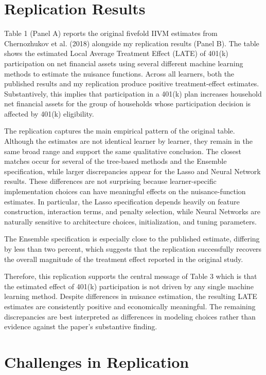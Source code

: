 \documentclass[12pt]{article}
\begin{document}
\section{Replication Results}



Table 1 (Panel A) reports the original fivefold IIVM estimates from Chernozhukov et al. (2018) alongside my replication results (Panel B). The table shows the estimated Local Average Treatment Effect (LATE) of 401(k) participation on net financial assets using several different machine learning methods to estimate the nuisance functions. Across all learners, both the published results and my replication produce positive treatment-effect estimates. Substantively, this implies that participation in a 401(k) plan increases household net financial assets for the group of households whose participation decision is affected by 401(k) eligibility.

The replication captures the main empirical pattern of the original table. Although the estimates are not identical learner by learner, they remain in the same broad range and support the same qualitative conclusion. The closest matches occur for several of the tree-based methods and the Ensemble specification, while larger discrepancies appear for the Lasso and Neural Network results. These differences are not surprising because learner-specific implementation choices can have meaningful effects on the nuisance-function estimates. In particular, the Lasso specification depends heavily on feature construction, interaction terms, and penalty selection, while Neural Networks are naturally sensitive to architecture choices, initialization, and tuning parameters.

The Ensemble specification is especially close to the published estimate, differing by less than two percent, which suggests that the replication successfully recovers the overall magnitude of the treatment effect reported in the original study.

Therefore, this replication supports the central message of Table 3 which is that the estimated effect of 401(k) participation is not driven by any single machine learning method. Despite differences in nuisance estimation, the resulting LATE estimates are consistently positive and economically meaningful. The remaining discrepancies are best interpreted as differences in modeling choices rather than evidence against the paper's substantive finding.

\section{Challenges in Replication}
\end{document}
